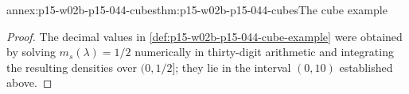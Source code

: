 \begin{annexitem}{annex:p15-w02b-p15-044-cubes}{thm:p15-w02b-p15-044-cubes}{The cube example}
\begin{proof}
The decimal values in \cref{def:p15-w02b-p15-044-cube-example} were
obtained by solving \(m_s(\lambda)=1/2\) numerically in thirty-digit
arithmetic and integrating the resulting densities over \((0,1/2]\); they
lie in the interval \((0,10)\) established above.
\end{proof}
\end{annexitem}
